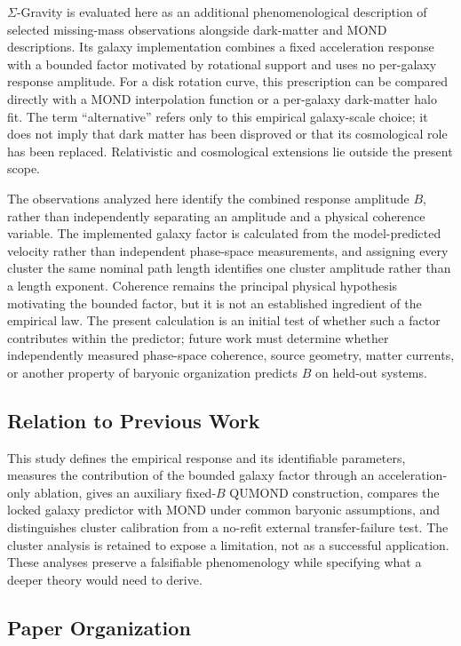 \documentclass[aps,prd,reprint,superscriptaddress,showpacs,floatfix,longbibliography]{revtex4-2}
\begin{document}
$\Sigma$-Gravity is evaluated here as an additional phenomenological description of selected missing-mass observations alongside dark-matter and MOND descriptions. Its galaxy implementation combines a fixed acceleration response with a bounded factor motivated by rotational support and uses no per-galaxy response amplitude. For a disk rotation curve, this prescription can be compared directly with a MOND interpolation function or a per-galaxy dark-matter halo fit. The term ``alternative'' refers only to this empirical galaxy-scale choice; it does not imply that dark matter has been disproved or that its cosmological role has been replaced. Relativistic and cosmological extensions lie outside the present scope.

The observations analyzed here identify the combined response amplitude $B$, rather than independently separating an amplitude and a physical coherence variable. The implemented galaxy factor is calculated from the model-predicted velocity rather than independent phase-space measurements, and assigning every cluster the same nominal path length identifies one cluster amplitude rather than a length exponent. Coherence remains the principal physical hypothesis motivating the bounded factor, but it is not an established ingredient of the empirical law. The present calculation is an initial test of whether such a factor contributes within the predictor; future work must determine whether independently measured phase-space coherence, source geometry, matter currents, or another property of baryonic organization predicts $B$ on held-out systems.

\subsection{Relation to Previous Work}

This study defines the empirical response and its identifiable parameters, measures the contribution of the bounded galaxy factor through an acceleration-only ablation, gives an auxiliary fixed-$B$ QUMOND construction, compares the locked galaxy predictor with MOND under common baryonic assumptions, and distinguishes cluster calibration from a no-refit external transfer-failure test. The cluster analysis is retained to expose a limitation, not as a successful application. These analyses preserve a falsifiable phenomenology while specifying what a deeper theory would need to derive.

\subsection{Paper Organization}
\end{document}
